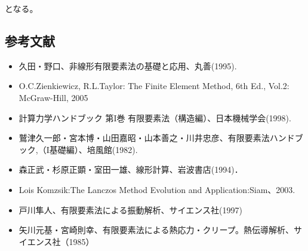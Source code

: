 \documentclass[a4paper,pandoc,ja=standard]{bxjsarticle}
\providecommand{\tightlist}{%
  \setlength{\itemsep}{0pt}\setlength{\parskip}{0pt}}
\begin{document}
となる。

\hypertarget{ux53c2ux8003ux6587ux732e}{%
\subsection{参考文献}\label{ux53c2ux8003ux6587ux732e}}

\begin{itemize}
\tightlist
\item
  久田・野口、非線形有限要素法の基礎と応用、丸善(1995).
\item
  O.C.Zienkiewicz, R.L.Taylor: The Finite Element Method, 6th Ed., Vol.2: McGraw-Hill, 2005
\item
  計算力学ハンドブック 第I巻 有限要素法（構造編）、日本機械学会(1998).
\item
  鷲津久一郎・宮本博・山田嘉昭・山本善之・川井忠彦、有限要素法ハンドブック,（I基礎編）、培風館(1982).
\item
  森正武・杉原正顕・室田一雄、線形計算、岩波書店(1994)．
\item
  Lois Komzsik:The Lanczos Method Evolution and Application:Siam、2003.
\item
  戸川隼人、有限要素法による振動解析、サイエンス社(1997)
\item
  矢川元基・宮崎則幸、有限要素法による熱応力・クリープ。熱伝導解析、サイエンス社（1985）
\end{itemize}
\end{document}
